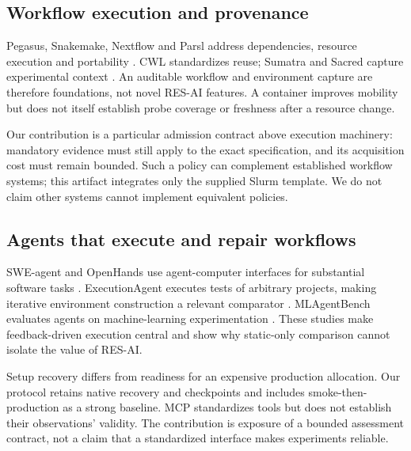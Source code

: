 \documentclass[pdflatex,sn-mathphys-num]{sn-jnl}
\theoremstyle{thmstylethree}
\newcommand{\tool}{\textsc{RES-AI}}
\begin{document}
\subsection{Workflow execution and provenance}
Pegasus, Snakemake, Nextflow and Parsl address dependencies, resource execution and portability \cite{deelman2015pegasus,molder2021snakemake,ditommaso2017nextflow,babuji2019parsl}. CWL standardizes reuse; Sumatra and Sacred capture experimental context \cite{crusoe2022cwl,davison2012sumatra,greff2017sacred}. An auditable workflow and environment capture are therefore foundations, not novel \tool{} features. A container improves mobility but does not itself establish probe coverage or freshness after a resource change.

Our contribution is a particular admission contract above execution machinery: mandatory evidence must still apply to the exact specification, and its acquisition cost must remain bounded. Such a policy can complement established workflow systems; this artifact integrates only the supplied Slurm template. We do not claim other systems cannot implement equivalent policies.

\subsection{Agents that execute and repair workflows}
SWE-agent and OpenHands use agent-computer interfaces for substantial software tasks \cite{yang2024sweagent,wang2025openhands}. ExecutionAgent executes tests of arbitrary projects, making iterative environment construction a relevant comparator \cite{bouzenia2025executionagent}. MLAgentBench evaluates agents on machine-learning experimentation \cite{huang2024mlagentbench}. These studies make feedback-driven execution central and show why static-only comparison cannot isolate the value of \tool{}.

Setup recovery differs from readiness for an expensive production allocation. Our protocol retains native recovery and checkpoints and includes smoke-then-production as a strong baseline. MCP standardizes tools but does not establish their observations' validity. The contribution is exposure of a bounded assessment contract, not a claim that a standardized interface makes experiments reliable.
\end{document}
